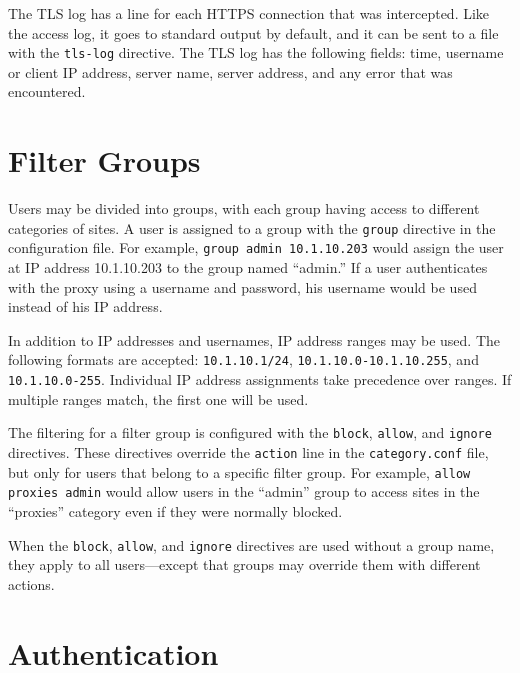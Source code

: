 \documentclass{article}
\begin{document}
The TLS log has a line for each HTTPS connection that was intercepted.
Like the access log, it goes to standard output by default, 
and it can be sent to a file with the \verb"tls-log" directive.
The TLS log has the following fields:
time, username or client IP address, server name, server address, 
and any error that was encountered.

\section{Filter Groups}

Users may be divided into groups, with each group having access to different categories of sites.
A user is assigned to a group with the \verb"group" directive in the configuration file.
For example, \verb"group admin 10.1.10.203" would assign the user at IP address 10.1.10.203
to the group named ``admin.'' 
If a user authenticates with the proxy using a username and password, 
his username would be used instead of his IP address.

In addition to IP addresses and usernames, IP address ranges may be used. 
The following formats are accepted: \verb"10.1.10.1/24", \verb"10.1.10.0-10.1.10.255",
and \verb"10.1.10.0-255".
Individual IP address assignments take precedence over ranges.
If multiple ranges match, the first one will be used.

The filtering for a filter group is configured with the \verb"block", \verb"allow", and \verb"ignore"
directives. These directives override the \verb"action" line in the \verb"category.conf" file,
but only for users that belong to a specific filter group.
For example, \verb"allow proxies admin" would allow users in the ``admin'' group
to access sites in the ``proxies'' category even if they were normally blocked.

When the \verb"block", \verb"allow", and \verb"ignore" directives are used without a group name,
they apply to all users---except that groups may override them with different actions.

\section{Authentication}
\end{document}
